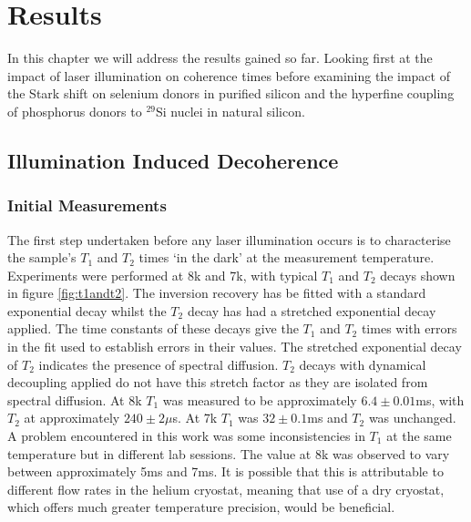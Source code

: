 \chapter{Results}

In this chapter we will address the results gained so far. Looking first at the impact of laser illumination on coherence times before examining the impact of the Stark shift on selenium donors in purified silicon and the hyperfine coupling of phosphorus donors to $^{29}$Si nuclei in natural silicon.

\section{Illumination Induced Decoherence}

\subsection{Initial Measurements}

The first step undertaken before any laser illumination occurs is to characterise the sample's $T_1$ and $T_2$ times `in the dark' at the measurement temperature. 
Experiments were performed at 8k and 7k, with typical $T_1$ and $T_2$ decays shown in figure \ref{fig:t1andt2}.
The inversion recovery has be fitted with a standard exponential decay whilst the $T_2$ decay has had a stretched exponential decay applied.
The time constants of these decays give the $T_1$ and $T_2$ times with errors in the fit used to establish errors in their values.
The stretched exponential decay of $T_2$ indicates the presence of spectral diffusion.
$T_2$ decays with dynamical decoupling applied do not have this stretch factor as they are isolated from spectral diffusion.
At 8k $T_1$ was measured to be approximately $6.4\pm0.01$ms, with $T_2$ at approximately $240\pm2\mu$s.
At 7k $T_1$ was $32\pm0.1$ms and $T_2$ was unchanged.
A problem encountered in this work was some inconsistencies in $T_1$ at the same temperature but in different lab sessions.
The value at 8k was observed to vary between approximately 5ms and 7ms.
It is possible that this is attributable to different flow rates in the helium cryostat, meaning that use of a dry cryostat, which offers much greater temperature precision, would be beneficial. 


